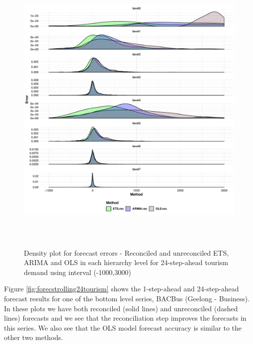 \documentclass[11pt,a4paper,]{article}
\begin{document}
\begin{figure}

{\centering \includegraphics[width=450px,height=550px]{Paper-Figures/results_Tourism/densityplot_24} 

}

\caption{Density plot for forecast errors -  Reconciled and unreconciled ETS, ARIMA and OLS in each hierarchy level for 24-step-ahead tourism demand using interval (-1000,3000)}\label{fig:densityplottourism}
\end{figure}

Figure \ref{fig:forecstrolling24tourism} shows the 1-step-ahead and
24-step-ahead forecast results for one of the bottom level series,
BACBus (Geelong - Business). In these plots we have both reconciled
(solid lines) and unreconciled (dashed lines) forecasts and we see that
the reconciliation step improves the forecasts in this series. We also
see that the OLS model forecast accuracy is similar to the other two
methods.
\end{document}
